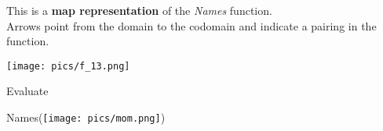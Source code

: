 \documentclass{ximera}
\author{Lee Wayand}
\begin{document}
\begin{exercise}





This is a \textbf{map representation} of the \textit{Names} function. \\

Arrows point from the domain to the codomain and indicate a pairing in the function.

\begin{image}
\texttt{[image: pics/f\_13.png]}
\end{image}















\begin{question}

Evaluate

\begin{center}
\Huge{Names(\texttt{[image: pics/mom.png]})}
\end{center}






\begin{multipleChoice}
\end{multipleChoice}

\end{question}



















\end{exercise}
\end{document}
